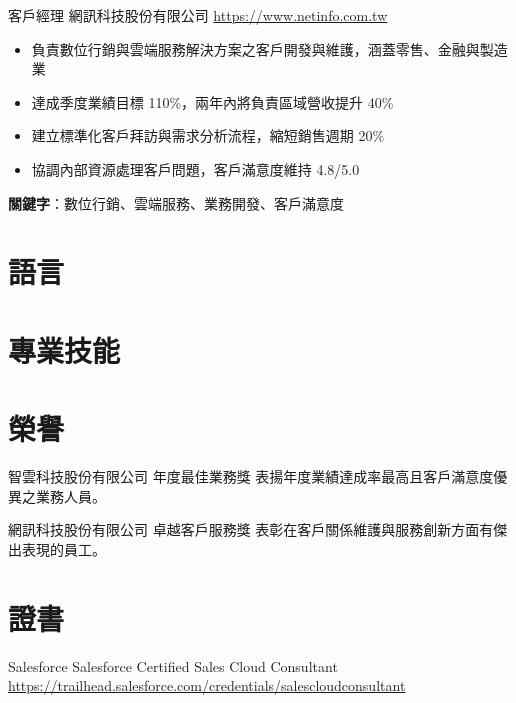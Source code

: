 \documentclass[a4paper, serif, 10pt]{moderncv}
\begin{document}
        {客戶經理}
        {網訊科技股份有限公司}
        {\url{https://www.netinfo.com.tw}}
        {}
        {\begin{itemize}
\item 負責數位行銷與雲端服務解決方案之客戶開發與維護，涵蓋零售、金融與製造業
\item 達成季度業績目標 110\%，兩年內將負責區域營收提升 40\%
\item 建立標準化客戶拜訪與需求分析流程，縮短銷售週期 20\%
\item 協調內部資源處理客戶問題，客戶滿意度維持 4.8/5.0
\end{itemize}
\textbf{關鍵字}：數位行銷、雲端服務、業務開發、客戶滿意度}
\section{語言}

\section{專業技能}

\section{榮譽}

        {智雲科技股份有限公司}
        {年度最佳業務獎}
        {}
        {}
        {表揚年度業績達成率最高且客戶滿意度優異之業務人員。}

        {網訊科技股份有限公司}
        {卓越客戶服務獎}
        {}
        {}
        {表彰在客戶關係維護與服務創新方面有傑出表現的員工。}
\section{證書}

        {Salesforce}
        {Salesforce Certified Sales Cloud Consultant}
        {\url{https://trailhead.salesforce.com/credentials/salescloudconsultant}}
        {}
        {}
\end{document}
